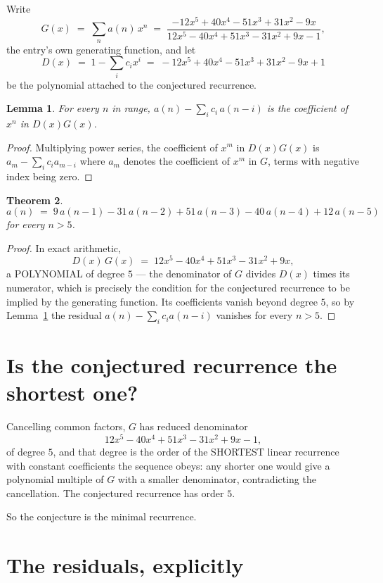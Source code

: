 \documentclass[11pt,a4paper]{article}
\theoremstyle{plain}
\newtheorem{theorem}{Theorem}
\newtheorem{lemma}[theorem]{Lemma}
\theoremstyle{definition}
\begin{document}
Write
\[
G(x)\;=\;\sum_{n}a(n)\,x^{n}\;=\;\frac{- 12 x^{5} + 40 x^{4} - 51 x^{3} + 31 x^{2} - 9 x}{12 x^{5} - 40 x^{4} + 51 x^{3} - 31 x^{2} + 9 x - 1},
\]
the entry's own generating function, and let
\[
D(x)\;=\;1-\sum_i c_i x^{i}\;=\;- 12 x^{5} + 40 x^{4} - 51 x^{3} + 31 x^{2} - 9 x + 1
\]
be the polynomial attached to the conjectured recurrence.

\begin{lemma}\label{lem:key}
For every $n$ in range, $a(n)-\sum_i c_i\,a(n-i)$ is the coefficient of $x^{n}$ in
$D(x)G(x)$.
\end{lemma}

\begin{proof}
Multiplying power series, the coefficient of $x^{m}$ in $D(x)G(x)$ is
$a_m-\sum_i c_i a_{m-i}$ where $a_m$ denotes the coefficient of $x^{m}$ in $G$, terms with
negative index being zero.
\end{proof}

\begin{theorem}
\[
a(n)\;=\;9\,a(n-1) - 31\,a(n-2) + 51\,a(n-3) - 40\,a(n-4) + 12\,a(n-5)
\]
for every $n>5$.
\end{theorem}

\begin{proof}
In exact arithmetic,
\[
D(x)\,G(x)\;=\;12 x^{5} - 40 x^{4} + 51 x^{3} - 31 x^{2} + 9 x,
\]
a POLYNOMIAL of degree $5$ --- the denominator of $G$ divides $D(x)$ times its numerator,
which is precisely the condition for the conjectured recurrence to be implied by the
generating function. Its coefficients vanish beyond degree $5$, so by
Lemma~\ref{lem:key} the residual $a(n)-\sum_ic_ia(n-i)$ vanishes for every
$n>5$.
\end{proof}

\section{Is the conjectured recurrence the shortest one?}

Cancelling common factors, $G$ has reduced denominator
\[
12 x^{5} - 40 x^{4} + 51 x^{3} - 31 x^{2} + 9 x - 1,
\]
of degree $5$, and that degree is the order of the SHORTEST linear recurrence with
constant coefficients the sequence obeys: any shorter one would give a polynomial multiple of
$G$ with a smaller denominator, contradicting the cancellation. The conjectured recurrence has
order $5$.

So the conjecture is the minimal recurrence.

\section{The residuals, explicitly}
\end{document}
